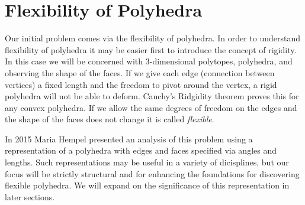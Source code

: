 \section{Flexibility of Polyhedra}

Our initial problem comes via the flexibility of polyhedra. In order to
understand flexibility of polyhedra it may be easier first to introduce the
concept of rigidity. In this case we will be concerned with 3-dimensional
polytopes, polyhedra, and observing the shape of the faces. If we give each
edge (connection between vertices) a fixed length and the freedom to pivot
around the vertex, a rigid polyhedra will not be able to deform. Cauchy's
Ridgidity theorem proves this for any convex polyhedra. \cite{Gluck_1975}
If we allow the same degrees of freedom on the edges and the shape of the
faces does not change it is called \emph{flexible}. \cite{Connelly_1977}

In 2015 Maria Hempel presented an analysis of this problem using a representation
of a polyhedra with edges and faces specified via angles and lengths. \cite{Hempel_2015}
Such representations may be useful in a variety of dicisplines, but our
focus will be strictly structural and for enhancing the foundations for
discovering flexible polyhedra.
We will expand on the significance of this representation in later sections.

